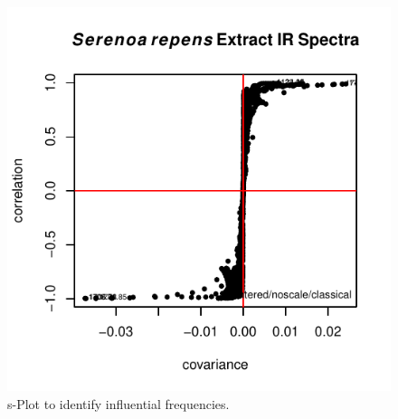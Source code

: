 \documentclass[letter,10pt,twocolumn,twoside,printwatermark=false]{pinp}
\begin{document}
\begin{Shaded}
\begin{Highlighting}[]
\StringTok{ }
   \NormalTok{,}
   \NormalTok{)}
\end{Highlighting}
\end{Shaded}

\begin{figure}

{\centering \includegraphics{ChemoSpec2_files/figure-latex/Chunk30a-1} 

}

\caption{\label{splot}s-Plot to identify influential frequencies.}\label{fig:Chunk30a}
\end{figure}

\begin{Shaded}
\begin{Highlighting}[]
\StringTok{ }
   \NormalTok{,}
   \NormalTok{,}
   \NormalTok{,}
   \NormalTok{(}\OperatorTok{-}\NormalTok{, }\NormalTok{),}
   \NormalTok{(}\OperatorTok{-}\NormalTok{, }\NormalTok{))}
\end{Highlighting}
\end{Shaded}
\end{document}
